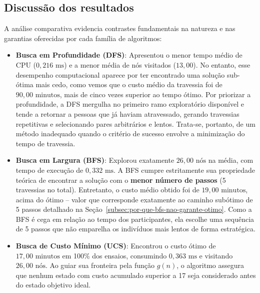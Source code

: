\subsection{Discussão dos resultados}
\label{subsec:discussao}

A análise comparativa evidencia contrastes fundamentais na natureza e nas garantias
oferecidas por cada família de algoritmos:

\begin{itemize}[leftmargin=1.5cm]
	\item \textbf{Busca em Profundidade (DFS)}: Apresentou o menor tempo médio de CPU
	      ($0{,}216\text{ ms}$) e a menor média de nós visitados ($13{,}00$). No entanto, esse
	      desempenho computacional aparece por ter encontrado uma solução sub-ótima mais cedo,
	      como vemos que o custo médio da travessia foi de $90{,}00\text{ minutos}$, mais de cinco
	      vezes superior ao tempo ótimo. Por priorizar a profundidade, a DFS mergulha no
	      primeiro ramo exploratório disponível e tende a retornar a pessoas que já haviam
	      atravessado, gerando travessias repetitivas e selecionando pares arbitrários e
	      lentos. Trata-se, portanto, de um método inadequado quando o critério de sucesso
	      envolve a minimização do tempo de travessia.

	\item \textbf{Busca em Largura (BFS)}: Explorou exatamente $26{,}00\text{ nós}$ na
	      média, com tempo de execução de $0{,}332\text{ ms}$. A BFS cumpre estritamente sua
	      propriedade teórica de encontrar a solução com o \textbf{menor número de passos}
	      (5 travessias no total). Entretanto, o custo médio obtido foi de
	      $19{,}00\text{ minutos}$, acima do ótimo -- valor que corresponde exatamente ao
	      caminho subótimo de 5 passos detalhado na Seção~\ref{subsec:por-que-bfs-nao-garante-otimo}.
	      Como a BFS é cega em relação ao tempo dos participantes, ela escolhe uma sequência
	      de 5 passos que não emparelha os indivíduos mais lentos de forma estratégica.

	\item \textbf{Busca de Custo Mínimo (UCS)}: Encontrou o custo ótimo de
	      $17{,}00\text{ minutos}$ em 100\% dos ensaios, consumindo $0{,}363\text{ ms}$ e
	      visitando $26{,}00\text{ nós}$. Ao guiar sua fronteira pela função $g(n)$,
	      o algoritmo assegura que nenhum estado com custo acumulado superior a 17 seja
	      considerado antes do estado objetivo ideal.


\end{itemize}
